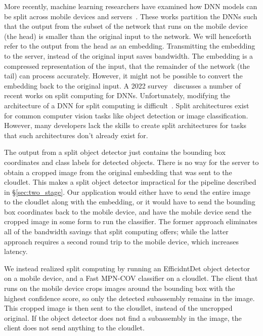 More recently, machine learning researchers have examined how DNN models can be
split across mobile devices and servers~\cite{Kang2017, Hsu2019, Eshratifar2019,
  Matsubara2019}.
These works partition the DNNs such that the output from the subset of the
network that runs on the mobile device (the head) is smaller than the
original input to the network.
We will henceforth refer to the output from the head as an embedding.
Transmitting the embedding to the server, instead of the original input saves
bandwidth.
The embedding is a compressed representation of the input, that the remainder of
the network (the tail) can process accurately.
However, it might not be possible to convert the embedding back to the original
input.
A 2022 survey~\cite{Matsubara2022} discusses a number of recent works on split
computing for DNNs.
Unfortunately, modifying the architecture of a DNN for split computing is
difficult~\cite{Matsubara2020}.
Split architectures exist for common computer vision tasks like object detection
or image classification.
However, many developers lack the skills to create split architectures for tasks
that such architectures don't already exist for.

The output from a split object detector just contains the bounding box
coordinates and class labels for detected objects.
There is no way for the server to obtain a cropped image from the original
embedding that was sent to the cloudlet.
This makes a split object detector impractical for the pipeline described in
\S\ref{sec:two_stage}.
Our application would either have to send the entire image to the cloudlet along
with the embedding, or it would have to send the bounding box coordinates back
to the mobile device, and have the mobile device send the cropped image in some
form to run the classifier.
The former approach eliminates all of the bandwidth savings that split computing
offers; while the latter approach requires a second round trip to the mobile
device, which increases latency.

We instead realized split computing by running an EfficidntDet object detector
on a mobile device, and a Fast MPN-COV classifier on a cloudlet.
The client that runs on the mobile device crops images around the bounding box
with the highest confidence score, so only the detected subassembly remains in
the image.
This cropped image is then sent to the cloudlet, instead of the uncropped
original.
If the object detector does not find a subassembly in the image, the client does
not send anything to the cloudlet.

